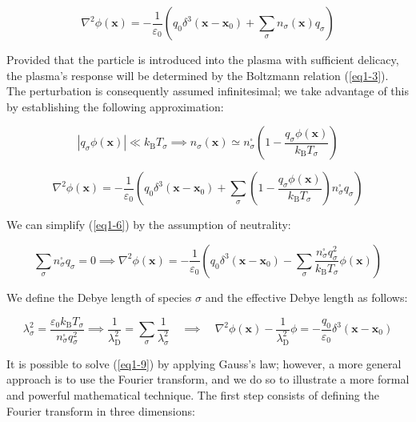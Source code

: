 \begin{equation*}
    \nabla^2\phi(\mathbf{x})=-\frac{1}{\varepsilon_0}\left(q_0\delta^3(\mathbf{x}-\mathbf{x}_0)+\sum_{\sigma}n_\sigma(\mathbf{x})q_\sigma\right)
\end{equation*}

Provided that the particle is introduced into the plasma with sufficient delicacy, the plasma's response will be determined by the Boltzmann relation (\ref{eq1-3}). The perturbation is consequently assumed infinitesimal; we take advantage of this by establishing the following approximation:

\begin{equation}
    |q_\sigma\phi(\mathbf{x})|\ll k_\mathrm{B}T_\sigma\implies n_\sigma(\mathbf{x})\simeq n_\sigma^\square\left(1-\frac{q_\sigma\phi(\mathbf{x})}{k_\mathrm{B}T_\sigma}\right)
\end{equation}

\begin{equation}
    \label{eq1-6}
    \nabla^2\phi(\mathbf{x})=-\frac{1}{\varepsilon_0}\left(q_0\delta^3(\mathbf{x}-\mathbf{x}_0)+\sum_{\sigma}\left(1-\frac{q_\sigma\phi(\mathbf{x})}{k_\mathrm{B}T_\sigma}\right)n_\sigma^\square q_\sigma\right)
\end{equation}

We can simplify (\ref{eq1-6}) by the assumption of neutrality:

\begin{equation}
    \label{eq1-7}
    \sum_\sigma n_\sigma^\square q_\sigma=0\implies\nabla^2\phi(\mathbf{x})=-\frac{1}{\varepsilon_0}\left(q_0\delta^3(\mathbf{x}-\mathbf{x}_0)-\sum_\sigma\frac{n_\sigma^\square q_\sigma^2}{k_\mathrm{B}T_\sigma}\phi(\mathbf{x})\right)
\end{equation}

We define the Debye length of species $\sigma$ and the effective Debye length as follows:

\begin{equation}
    \label{eq1-9}
    \lambda_\sigma^2=\frac{\varepsilon_0k_\mathrm{B}T_\sigma}{n_\sigma^\square q_\sigma^2}\implies\frac{1}{\lambda_\mathrm{D}^2}=\sum_\sigma\frac{1}{\lambda^2_\sigma}\quad\implies  \quad\nabla^2\phi(\mathbf{x})-\frac{1}{\lambda_\mathrm{D}^2}\phi=-\frac{q_0}{\varepsilon_0}\delta^3(\mathbf{x}-\mathbf{x}_0)
\end{equation}

It is possible to solve (\ref{eq1-9}) by applying Gauss's law; however, a more general approach is to use the Fourier transform, and we do so to illustrate a more formal and powerful mathematical technique. The first step consists of defining the Fourier transform in three dimensions:


